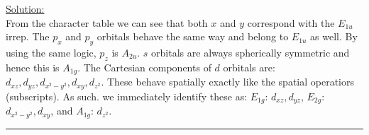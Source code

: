 \noindent
\underline{Solution:}\\

\noindent
From the character table we can see that both $x$ and $y$ correspond with the $E_{1u}$ irrep. The $p_x$ and $p_y$ orbitals
behave the same way and belong to $E_{1u}$ as well. By using the same logic, $p_z$ is $A_{2u}$. $s$ orbitals are always spherically
symmetric and hence this is $A_{1g}$. The Cartesian components of $d$ orbitals are: $d_{xz}, d_{yz}, d_{x^2 - y^2}, d_{xy}, d_{z^2}$.
These behave spatially exactly like the spatial operatiors (subscripts). As such. we immediately identify these as:
$E_{1g}$: $d_{xz}, d_{yz}$, $E_{2g}$: $d_{x^2-y^2}, d_{xy}$, and $A_{1g}$: $d_{z^2}$.\\


\hrule\vspace{0.5cm}



